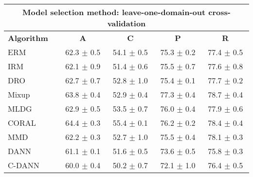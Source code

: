 \documentclass{article}
\begin{document}
\begin{center}
\begin{tabular}{lcccc}
\toprule
\multicolumn{5}{c}{\textbf{Model selection method: leave-one-domain-out cross-validation}} \\
\midrule
\textbf{Algorithm}    & \textbf{A}                & \textbf{C}                & \textbf{P}                & \textbf{R}                \\
\midrule
ERM                       & 62.3 $\pm$ 0.5            & 54.1 $\pm$ 0.5            & 75.3 $\pm$ 0.2            & 77.4 $\pm$ 0.5            \\
IRM                       & 62.1 $\pm$ 0.9            & 51.4 $\pm$ 0.6            & 75.5 $\pm$ 0.7            & 77.6 $\pm$ 0.8            \\
DRO                 & 62.7 $\pm$ 0.7            & 52.8 $\pm$ 1.0            & 75.4 $\pm$ 0.1            & 77.7 $\pm$ 0.2            \\
Mixup                     & 63.8 $\pm$ 0.4            & 52.9 $\pm$ 0.4            & 77.3 $\pm$ 0.4            & 78.7 $\pm$ 0.4            \\
MLDG                      & 62.9 $\pm$ 0.5            & 53.5 $\pm$ 0.7            & 76.0 $\pm$ 0.4            & 77.9 $\pm$ 0.6            \\
CORAL                     & 64.4 $\pm$ 0.3            & 55.4 $\pm$ 0.1            & 76.2 $\pm$ 0.2            & 78.4 $\pm$ 0.4            \\
MMD                       & 62.2 $\pm$ 0.3            & 52.7 $\pm$ 1.0            & 75.5 $\pm$ 0.4            & 78.1 $\pm$ 0.3            \\
DANN                       & 61.1 $\pm$ 0.1            & 51.6 $\pm$ 0.5            & 73.6 $\pm$ 0.5            & 75.8 $\pm$ 0.3            \\
C-DANN                   & 60.0 $\pm$ 0.4            & 50.2 $\pm$ 0.7            & 72.1 $\pm$ 1.0            & 76.4 $\pm$ 0.5            \\
\bottomrule
\end{tabular}
\end{center}
\end{document}
